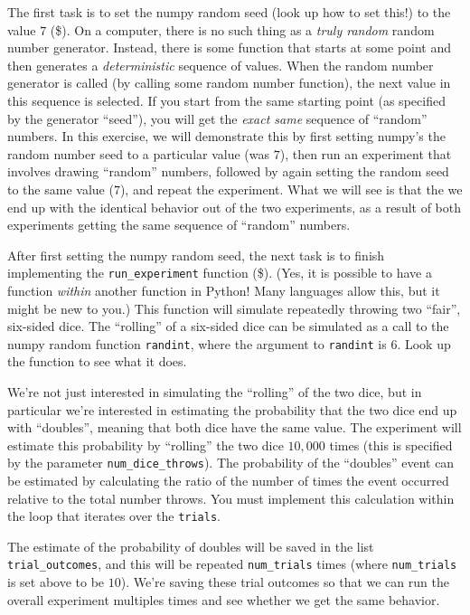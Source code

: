 \documentclass[10pt]{article}
\begin{document}
\begin{enumerate}
The first task is to set the numpy random seed (look up how to set this!) to the value $7$ (\$). On a computer, there is no such thing as a {\em truly random} random number generator. Instead, there is some function that starts at some point and then generates a {\em deterministic} sequence of values. When the random number generator is called (by calling some random number function), the next value in this sequence is selected. If you start from the same starting point (as specified by the generator ``seed''), you will get the {\em exact same} sequence of ``random'' numbers. In this exercise, we will demonstrate this by first setting numpy's the random number seed to a particular value (was $7$), then run an experiment that involves drawing ``random'' numbers, followed by again setting the random seed to the same value ($7$), and repeat the experiment. What we will see is that the we end up with the identical behavior out of the two experiments, as a result of both experiments getting the same sequence of ``random'' numbers.

After first setting the numpy random seed, the next task is to finish implementing the {\tt run\_experiment} function (\$). (Yes, it is possible to have a function {\em within} another function in Python! Many languages allow this, but it might be new to you.)
This function will simulate repeatedly throwing two ``fair'', six-sided dice. The ``rolling'' of a six-sided dice can be simulated as a call to the numpy random function {\tt randint}, where the argument to {\tt randint} is $6$. Look up the function to see what it does.

We're not just interested in simulating the ``rolling'' of the two dice, but in particular we're interested in estimating the probability that the two dice end up with ``doubles'', meaning that both dice have the same value. The experiment will estimate this probability by ``rolling'' the two dice $10,000$ times (this is specified by the parameter {\tt num\_dice\_throws}). The probability of the ``doubles'' event can be estimated by calculating the ratio of the number of times the event occurred relative to the total number throws. You must implement this calculation within the loop that iterates over the {\tt trials}.

The estimate of the probability of doubles will be saved in the list {\tt trial\_outcomes}, and this will be repeated {\tt num\_trials} times (where {\tt num\_trials} is set above to be $10$). We're saving these trial outcomes so that we can run the overall experiment multiples times and see whether we get the same behavior.


\end{enumerate}
\end{document}
